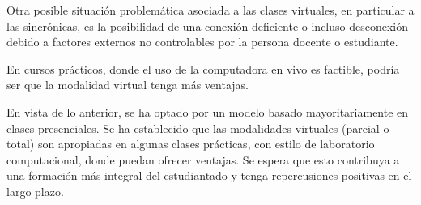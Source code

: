 Otra posible situación problemática asociada a las clases virtuales, en particular a las sincrónicas, es la posibilidad de una conexión deficiente o incluso desconexión debido a factores externos no controlables por la persona docente o estudiante. 

En cursos prácticos, donde el uso de la computadora en vivo es factible, podría ser que la modalidad virtual tenga más ventajas. 

En vista de lo anterior, se ha optado por un modelo basado mayoritariamente en clases presenciales. Se ha establecido que las modalidades virtuales (parcial o total) son apropiadas en algunas clases prácticas, con estilo de laboratorio computacional, donde puedan ofrecer ventajas. Se espera que esto contribuya a una formación más integral del estudiantado y tenga repercusiones positivas en el largo plazo.
